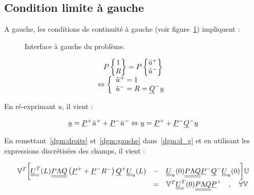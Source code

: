 \subsection{Condition limite à gauche}

A gauche, les conditions de continuité à gauche (voir figure~\ref{fig:interface}) impliquent :

\begin{figure}[p]
	\centering
	
    \caption{\label{fig:interface}Interface à gauche du problème.}
\end{figure}

\begin{equation*}
    \begin{array}{c}
        P\begin{Bmatrix}1\\R\end{Bmatrix} = P\begin{Bmatrix}\tilde{u}^+\\\tilde{u}^-\end{Bmatrix}\\
            \Leftrightarrow \left\{\begin{array}{l}
                    \tilde{u}^+ = 1\\
                    \tilde{u}^- = R = \underline{Q}^-\underline{u}
            \end{array}\right.
    \end{array}
\end{equation*}

En ré-exprimant $u$, il vient :

\begin{equation}
    \underline{u} = \underline{P}^+\tilde{u}^+ + \underline{P}^-\tilde{u}^- \Leftrightarrow \underline{u} = \underline{P}^+ + \underline{P}^-\underline{Q}^-\underline{u}\label{dgm:gauche}
\end{equation}

En remettant~\eqref{dgm:droite} et~\eqref{dgm:gauche} dans~\eqref{dgm:d_g} et en utilisant les expressions discrétisées
des champs, il vient :

\begin{equation}
    \begin{array}{rcl}
        \mathbb{V}^T\bigg[\underline{\underline{U}}_v^T(L)\underline{\underline{P\Lambda Q}}\left(\underline{P}^+ + \underline{P}^-R^-\right)\underline{Q}^+\underline{\underline{U}}_u(L) & - &
    \underline{\underline{U}}_u(0)\underline{\underline{P\Lambda Q}}\underline{P}^-\underline{Q}^-\underline{\underline{U}}_u(0)\bigg] \mathbb{U}\\
    & = & \mathbb{V}^T\underline{\underline{U}}_v^T(0)\underline{\underline{P\Lambda Q}}\underline{P}^+ \quad,\quad \forall\mathbb{V}
    \end{array}
\end{equation}

